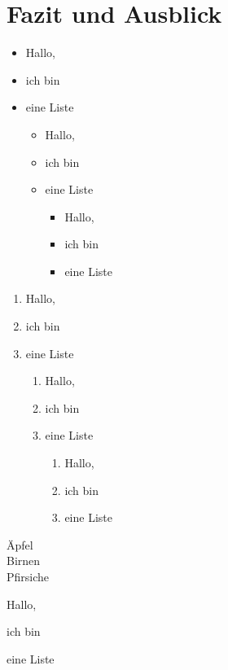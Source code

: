 

\chapter{Fazit und Ausblick}

\blindtext[5]

\begin{itemize}
\item Hallo,
\item ich bin
\item eine Liste
\begin{itemize}
\item Hallo,
\item ich bin
\item eine Liste
\begin{itemize}
\item Hallo,
\item ich bin
\item eine Liste
\end{itemize}
\end{itemize}
\end{itemize}


\begin{enumerate}
\item Hallo,
\item ich bin
\item eine Liste
\begin{enumerate}
\item Hallo,
\item ich bin
\item eine Liste
\begin{enumerate}
\item Hallo,
\item ich bin
\item eine Liste
\end{enumerate}
\end{enumerate}
\end{enumerate}

\begin{description}
\item[Äpfel] \blindtext
\item[Birnen] \blindtext
\item[Pfirsiche] \blindtext
\end{description}


\begin{compactitem}
\item Hallo,
\item ich bin
\item eine Liste
\end{compactitem}

